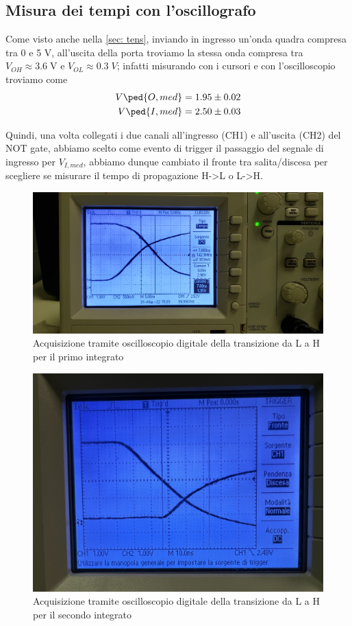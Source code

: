 \documentclass[10pt, a4paper, italian]{article}
\begin{document}
\subsection{Misura dei tempi con l'oscillografo}
Come visto anche nella \cref{sec: tens}, inviando in ingresso un'onda quadra
compresa tra 0 e 5 V, all'uscita della porta troviamo la stessa onda compresa
tra $V_{OH} \approx 3.6 \; \si{\V}$ e $V_{OL} \approx 0.3  \; \si{V}$;
infatti misurando con i cursori e con l'oscilloscopio troviamo come
\begin{align*}
V\ped{O, med} = 1.95 \pm 0.02 \\
V\ped{I, med} = 2.50 \pm 0.03 \\
\end{align*}

Quindi, una volta collegati i due canali all'ingresso (CH1) e all'uscita (CH2)
del NOT gate, abbiamo scelto come evento di trigger il passaggio del segnale
di ingresso per $V_{I,med}$, abbiamo dunque cambiato il fronte tra
salita/discesa per scegliere se misurare il tempo di propagazione H->L o L->H.
\begin{figure}[htbp]
\centering
	\includegraphics[width=\textwidth]{LH1}
	\caption{Acquisizione tramite oscilloscopio digitale della transizione da
	L a H per il primo integrato}
\end{figure}
\begin{figure}[htbp]
\centering
	\includegraphics[width=\textwidth]{LH2}
	\caption{Acquisizione tramite oscilloscopio digitale della transizione da
	L a H per il secondo integrato}
\end{figure}
\end{document}
